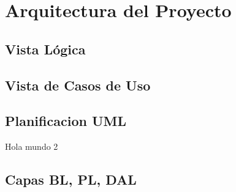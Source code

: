 \section*{Arquitectura del Proyecto}

\subsection*{Vista Lógica}

\subsection*{Vista de Casos de Uso}


\subsection*{Planificacion UML}
Hola mundo 2
\subsection*{Capas BL, PL, DAL}